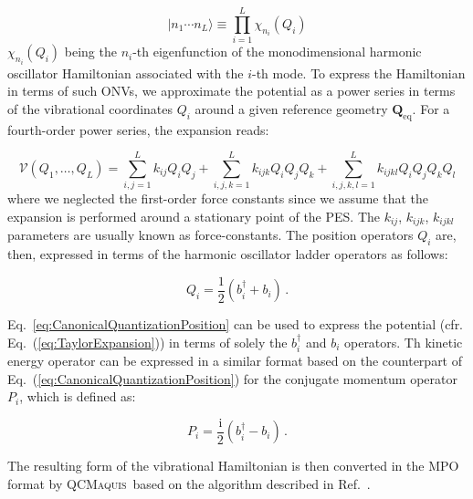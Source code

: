\documentclass[bibliography=totoc,12pt,a4paper]{scrartcl}
\newcommand{\qcm}{\textsc{QCMaquis}}
\begin{document}
\begin{equation}
  | n_1 \cdots n_L \rangle \equiv \prod_{i=1}^L \chi_{n_i}(Q_i)
  \label{eq:HarmonicOscillatorBasis}
\end{equation}
%
$\chi_{n_i}(Q_i)$ being the $n_i$-th eigenfunction of the monodimensional harmonic oscillator Hamiltonian associated with the $i$-th mode.
To express the Hamiltonian in terms of such ONVs, we approximate the potential as a power series in terms of the vibrational coordinates $Q_i$ around a given reference geometry $\bm{Q}_\text{eq}$.
For a fourth-order power series, the expansion reads:

\begin{equation}
  \mathcal{V}(Q_1, \ldots, Q_L) 
	= \sum_{i,j=1}^L k_{ij} Q_i Q_j + \sum_{i,j,k=1}^L k_{ijk} Q_i Q_j Q_k
    + \sum_{i,j,k,l=1}^L k_{ijkl} Q_i Q_j Q_k Q_l
  \label{eq:TaylorExpansion}
\end{equation}
%
where we neglected the first-order force constants since we assume that the expansion is performed around a stationary point of the PES.
The $k_{ij}$, $k_{ijk}$, $k_{ijkl}$ parameters are usually known as force-constants.
The position operators $Q_i$ are, then, expressed in terms of the harmonic oscillator ladder operators as follows:

\begin{equation}
  Q_i = \frac{1}{2} \left( b_i^\dagger + b_i \right) \, .
  \label{eq:CanonicalQuantizationPosition}
\end{equation}

Eq.~\ref{eq:CanonicalQuantizationPosition} can be used to express the potential (cfr. Eq.~(\ref{eq:TaylorExpansion})) in terms of solely the $b_i^\dagger$ and $b_i$ operators.
Th kinetic energy operator can be expressed in a similar format based on the counterpart of Eq.~(\ref{eq:CanonicalQuantizationPosition}) for the conjugate momentum operator $P_i$, which is defined as:

\begin{equation}
  P_i = \frac{\mathrm{i}}{2} \left( b_i^\dagger - b_i \right) \, .
  \label{eq:CanonicalQuantizationMomentum}
\end{equation}

The resulting form of the vibrational Hamiltonian is then converted in the MPO format by \qcm\ based on the algorithm described in Ref.~. \\
\end{document}
